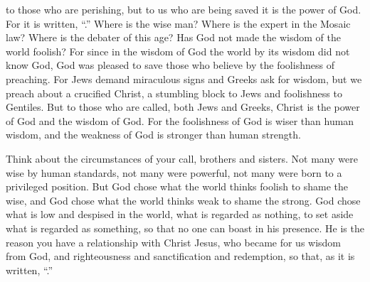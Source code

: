 {to those who are perishing,
but
to us
who are being saved
it is
the power
of God.
For
it is written, “{}.”
Where
is the wise
man? Where
is the expert in the Mosaic law? Where
is the debater
of this
age? Has God
not
made
the wisdom
of the world
foolish?
For
since
in
the wisdom
of God
the world
by
its wisdom
did not
know
God,
God
was pleased
to save
those who believe
by
the foolishness
of preaching.
For
Jews
demand
miraculous signs
and
Greeks
ask for
wisdom,
but
we
preach
about a crucified
Christ,
a stumbling block
to Jews
and
foolishness
to Gentiles.
But
to those
who are called,
both
Jews
and
Greeks,
Christ
is the power
of God
and
the wisdom
of God.
For
the foolishness
of God
is
wiser than
human wisdom,
and
the weakness
of God
is stronger than
human strength.
\par }{\PP {}Think about the circumstances of your
call,
brothers and sisters.
Not
many
were wise
by
human standards,
not
many
were powerful,
not
many
were born to a privileged position.
But
God
chose
what the world
thinks foolish
to
shame
the wise,
and
God
chose
what the world
thinks weak
to
shame
the strong.
God
chose
what is low
and
despised
in the world,
what is regarded as nothing, to set aside what is regarded as something,
so that
no
one can boast
in his presence.
He
is the reason you
have a relationship with
Christ
Jesus,
who
became
for us
wisdom
from
God,
and
righteousness
and
sanctification
and
redemption,
so that,
as
it is written, “{}.”

}
